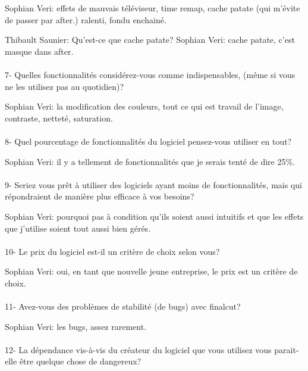 Sophian Veri: effets de mauvais téléviseur, time remap, cache patate (qui m'évite
de passer par after.) ralenti, fondu enchainé.

Thibault Saunier: Qu'est-ce que cache patate?
Sophian Veri: cache patate, c'est masque dans after.

\paragraph{}
7-  Quelles fonctionnalités considérez-vous comme indispensables, (même si vous
ne les utilisez pas au quotidien)?

Sophian Veri: la modification des couleurs,  tout ce qui est travail de
l'image, contraste, netteté, saturation.

\paragraph{}
8- Quel pourcentage de fonctionnalités du logiciel pensez-vous utiliser
en tout?

Sophian Veri: il y a  tellement de fonctionnalités que je serais tenté
de dire 25\%.

\paragraph{}
9- Seriez vous prêt à utiliser des logiciels ayant moins de fonctionnalités,
mais qui répondraient de manière plus efficace à vos besoins?

Sophian Veri: pourquoi pas à condition qu'ils soient aussi intuitifs et que les effets
que j'utilise soient tout aussi bien gérés.

\paragraph{}
10-  Le prix du logiciel est-il un critère de choix selon vous?

Sophian Veri: oui, en tant que nouvelle jeune entreprise, le prix est
un critère de choix.

\paragraph{}
11- Avez-vous des problèmes de stabilité (de bugs) avec finalcut?

Sophian Veri: les bugs, assez rarement.

\paragraph{}
12- La dépendance vis-à-vis du créateur du logiciel que vous utilisez
vous parait-elle être quelque chose de dangereux?

